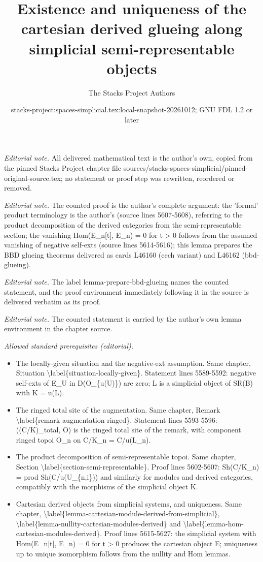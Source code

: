 \documentclass{stacks-project}
\title{Existence and uniqueness of the cartesian derived glueing along simplicial semi-representable objects}
\author{The Stacks Project Authors}
\date{stacks-project:spaces-simplicial.tex:local-snapshot-20261012; GNU FDL 1.2 or later}
\theoremstyle{plain}
\theoremstyle{definition}
\theoremstyle{remark}
\numberwithin{equation}{subsection}
\begin{document}
\maketitle
\noindent\textit{Editorial note.} All delivered mathematical text is the author's own, copied from the pinned Stacks Project chapter file sources/stacks-spaces-simplicial/pinned-original-source.tex; no statement or proof step was rewritten, reordered or removed.\par\medskip
\noindent\textit{Editorial note.} The counted proof is the author's complete argument: the 'formal' product terminology is the author's (source lines 5607-5608), referring to the product decomposition of the derived categories from the semi-representable section; the vanishing Hom(E\_n[t], E\_n) = 0 for t > 0 follows from the assumed vanishing of negative self-exts (source lines 5614-5616); this lemma prepares the BBD glueing theorems delivered as cards L46160 (cech variant) and L46162 (bbd-glueing).\par\medskip
\noindent\textit{Editorial note.} The label lemma-prepare-bbd-glueing names the counted statement, and the proof environment immediately following it in the source is delivered verbatim as its proof.\par\medskip
\noindent\textit{Editorial note.} The counted statement is carried by the author's own lemma environment in the chapter source.\par\medskip
\noindent\textit{Allowed standard prerequisites (editorial).}\begin{itemize}
\item The locally-given situation and the negative-ext assumption. Same chapter, Situation \textbackslash{}label\{situation-locally-given\}. Statement lines 5589-5592: negative self-exts of E\_U in D(O\_\{u(U)\}) are zero; L is a simplicial object of SR(B) with K = u(L).
\item The ringed total site of the augmentation. Same chapter, Remark \textbackslash{}label\{remark-augmentation-ringed\}. Statement lines 5593-5596: ((C/K)\_total, O) is the ringed total site of the remark, with component ringed topoi O\_n on C/K\_n = C/u(L\_n).
\item The product decomposition of semi-representable topoi. Same chapter, Section \textbackslash{}label\{section-semi-representable\}. Proof lines 5602-5607: Sh(C/K\_n) = prod Sh(C/u(U\_\{n,i\})) and similarly for modules and derived categories, compatibly with the morphisms of the simplicial object K.
\item Cartesian derived objects from simplicial systems, and uniqueness. Same chapter, \textbackslash{}label\{lemma-cartesian-module-derived-from-simplicial\}, \textbackslash{}label\{lemma-nullity-cartesian-modules-derived\} and \textbackslash{}label\{lemma-hom-cartesian-modules-derived\}. Proof lines 5615-5627: the simplicial system with Hom(E\_n[t], E\_n) = 0 for t > 0 produces the cartesian object E; uniqueness up to unique isomorphism follows from the nullity and Hom lemmas.
\end{itemize}\medskip
\end{document}
